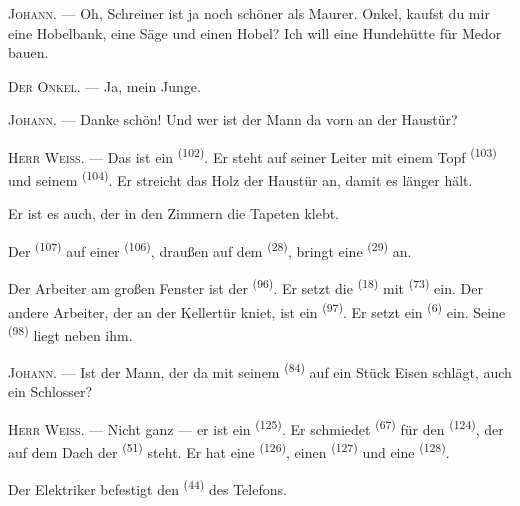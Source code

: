 \textsc{Johann}. --- Oh, Schreiner ist ja noch schöner als Maurer. Onkel, kaufst du
mir eine Hobelbank, eine Säge und einen Hobel? Ich will eine Hundehütte für Medor
bauen.

\textsc{Der Onkel}. --- Ja, mein Junge.

\textsc{Johann}. --- Danke schön! Und wer ist der Mann da vorn an der Haustür?

\VUsaut{3.0mm}
\VUsaut{3.0mm}

\textsc{Herr Weiß}. --- Das ist ein  \textsuperscript{(102)}. Er steht
auf seiner Leiter mit einem Topf  \textsuperscript{(103)} und seinem
 \textsuperscript{(104)}. Er streicht das Holz der Haustür an, damit
es länger hält.

Er ist es auch, der in den Zimmern die Tapeten klebt.

Der  \textsuperscript{(107)} auf einer 
\textsuperscript{(106)}, draußen auf dem  \textsuperscript{(28)},
bringt eine  \textsuperscript{(29)} an.

Der Arbeiter am großen Fenster ist der  \textsuperscript{(96)}. Er
setzt die  \textsuperscript{(18)} mit 
\textsuperscript{(73)} ein. Der andere Arbeiter, der an der Kellertür kniet, ist ein
 \textsuperscript{(97)}. Er setzt ein 
\textsuperscript{(6)} ein. Seine  \textsuperscript{(98)} liegt neben
ihm.

\textsc{Johann}. --- Ist der Mann, der da mit seinem 
\textsuperscript{(84)} auf ein Stück Eisen schlägt, auch ein Schlosser?

\textsc{Herr Weiß}. --- Nicht ganz --- er ist ein 
\textsuperscript{(125)}. Er schmiedet  \textsuperscript{(67)} für
den  \textsuperscript{(124)}, der auf dem Dach der
 \textsuperscript{(51)} steht. Er hat eine 
\textsuperscript{(126)}, einen  \textsuperscript{(127)} und eine
 \textsuperscript{(128)}.

Der Elektriker befestigt den  \textsuperscript{(44)} des
Telefons.

\VUsaut{3.0mm}

